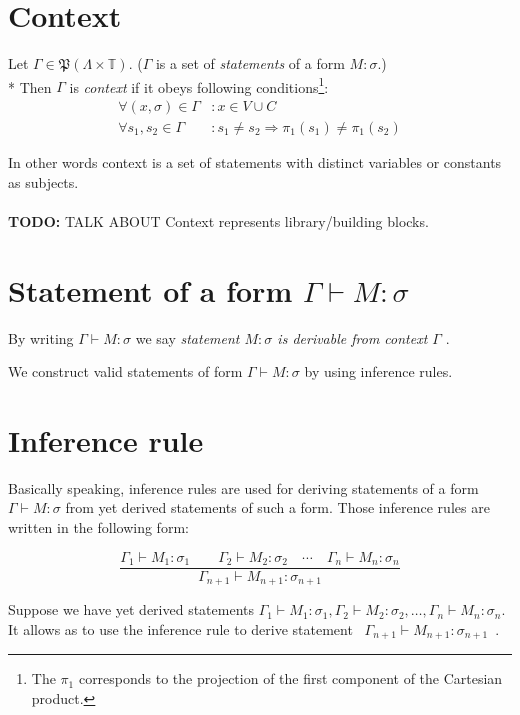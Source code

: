 \documentclass[12pt,a4paper]{report}
\newcommand{\turst}[3]{$#1 \vdash #2 : #3$\xspace}
\newcommand{\GMS}{\turst{\Gamma}{M}{\sigma}}
\begin{document}
\section{Context}

	Let $\Gamma \in \mathfrak P \left({\Lambda \times  \mathbb{T}}\right)$. 
	($\Gamma$ is a set of {\it statements} of a form $M : \sigma$.)	\\*
	Then $\Gamma$ is {\it context} if it obeys following 
	conditions\footnote{
	The $\pi_1$ corresponds to the projection of the first component of the Cartesian product.
	}:
	\begin{align*}
		 \forall (x,\sigma) \in \Gamma &: x \in V \cup C \\
		 \forall s_1,s_2 \in \Gamma &: s_1 \neq s_2 \Rightarrow \pi_1(s_1) \neq \pi_1(s_2)
    \end{align*}
    
	In other words context is a set of statements with distinct variables or constants as subjects.
	\\\\
	\textbf{TODO:} TALK ABOUT Context represents library/building blocks.
	
	
	
\section{Statement of a form \GMS}

	By writing \GMS we say 
	{\it statement $M : \sigma$ is derivable from context $\Gamma$ }.

	We construct valid statements of form \GMS by using inference rules.
	
		
\section{Inference rule}		
	
	Basically speaking, inference rules are used for deriving statements of a form 
	\GMS from yet derived statements of such a form.
	Those inference rules are written in the following form:
	
	\begin{equation*}
		\frac{\Gamma_1 \vdash M_1 : \sigma_1 \qquad
			  \Gamma_2 \vdash M_2 : \sigma_2 \quad
			  \dotsm \quad
		      \Gamma_n \vdash M_n : \sigma_n}
		     {\Gamma_{n+1} \vdash M_{n+1} : \sigma_{n+1}}
	\end{equation*}	
	
	Suppose we have yet derived statements 
	$\Gamma_1 \vdash M_1 : \sigma_1 ,
	 \Gamma_2 \vdash M_2 : \sigma_2 ,
	 \dots ,
	 \Gamma_n \vdash M_n : \sigma_n$. 
	It allows as to use the inference rule to derive statement
	\mbox{ $\Gamma_{n+1} \vdash M_{n+1} : \sigma_{n+1}$ }.
	 
\end{document}
